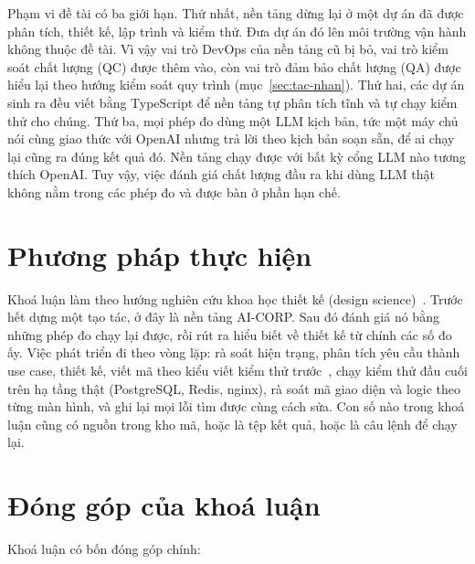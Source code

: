 Phạm vi đề tài có ba giới hạn. Thứ nhất, nền tảng dừng lại ở một dự án đã được phân tích, thiết kế, lập trình và kiểm thử. Đưa dự án đó lên môi trường vận hành không thuộc đề tài. Vì vậy vai trò DevOps của nền tảng cũ bị bỏ, vai trò kiểm soát chất lượng (QC) được thêm vào, còn vai trò đảm bảo chất lượng (QA) được hiểu lại theo hướng kiểm soát quy trình (mục~\ref{sec:tac-nhan}). Thứ hai, các dự án sinh ra đều viết bằng TypeScript để nền tảng tự phân tích tĩnh và tự chạy kiểm thử cho chúng. Thứ ba, mọi phép đo dùng một LLM kịch bản, tức một máy chủ nói cùng giao thức với OpenAI nhưng trả lời theo kịch bản soạn sẵn, để ai chạy lại cũng ra đúng kết quả đó. Nền tảng chạy được với bất kỳ cổng LLM nào tương thích OpenAI. Tuy vậy, việc đánh giá chất lượng đầu ra khi dùng LLM thật không nằm trong các phép đo và được bàn ở phần hạn chế.

\section{Phương pháp thực hiện}

Khoá luận làm theo hướng nghiên cứu khoa học thiết kế (design science)~\cite{hevner2004}. Trước hết dựng một tạo tác, ở đây là nền tảng AI-CORP. Sau đó đánh giá nó bằng những phép đo chạy lại được, rồi rút ra hiểu biết về thiết kế từ chính các số đo ấy. Việc phát triển đi theo vòng lặp: rà soát hiện trạng, phân tích yêu cầu thành use case, thiết kế, viết mã theo kiểu viết kiểm thử trước~\cite{beck2002}, chạy kiểm thử đầu cuối trên hạ tầng thật (PostgreSQL, Redis, nginx), rà soát mã giao diện và logic theo từng màn hình, và ghi lại mọi lỗi tìm được cùng cách sửa. Con số nào trong khoá luận cũng có nguồn trong kho mã, hoặc là tệp kết quả, hoặc là câu lệnh để chạy lại.

\section{Đóng góp của khoá luận}

Khoá luận có bốn đóng góp chính:

